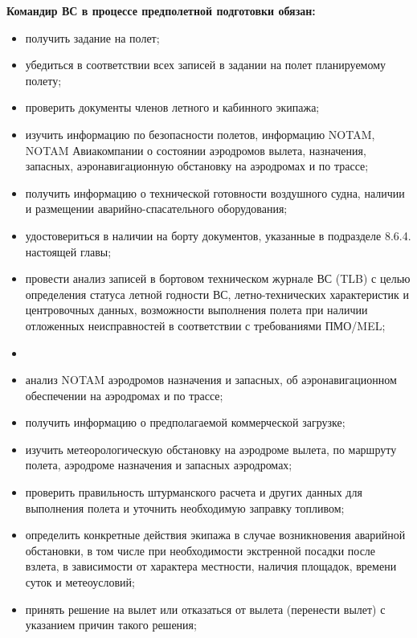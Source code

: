 \textbf{Командир ВС в процессе предполетной подготовки обязан:}
\begin{itemize}
    \item получить задание на полет;
    \item убедиться в соответствии всех записей в задании на полет планируемому полету;
    \item проверить документы членов летного и кабинного экипажа; 
    \item изучить информацию по безопасности полетов, информацию NOTAM, NOTAM Авиакомпании о состоянии аэродромов вылета, назначения, запасных, аэронавигационную обстановку на аэродромах и по трассе; 
    \item получить информацию о технической готовности воздушного судна, наличии и размещении аварийно-спасательного оборудования; 
    \item удостовериться в наличии на борту документов, указанные в подразделе 8.6.4. настоящей главы;
    \item провести анализ записей в бортовом техническом журнале ВС (TLB) с целью определения статуса летной годности ВС, летно-технических характеристик и центровочных данных, возможности выполнения полета при наличии отложенных неисправностей в соответствии с требованиями ПМО/MEL;
    \item {}
    \item анализ NOTAM аэродромов назначения и запасных, об аэронавигационном обеспечении на аэродромах и по трассе; 
    \item получить информацию о предполагаемой коммерческой загрузке;
    \item изучить метеорологическую обстановку на аэродроме вылета, по маршруту полета, аэродроме назначения и запасных аэродромах;
    \item проверить правильность штурманского расчета и других данных для выполнения полета и уточнить необходимую заправку топливом;
    \item определить конкретные действия экипажа в случае возникновения аварийной обстановки, в том числе при необходимости экстренной посадки после взлета, в зависимости от характера местности, наличия площадок, времени суток и метеоусловий;
    \item принять решение на вылет или отказаться от вылета (перенести вылет) с указанием причин такого решения;

\end{itemize}
